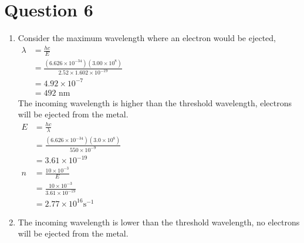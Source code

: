 \documentclass[a4paper, fleqn]{article}
\begin{document}
\section{Question 6}
\begin{enumerate}[label=(\alph{*})]
\item Consider the maximum wavelength where an electron would be ejected,\\
$\begin{aligned}\lambda&=\frac{hc}{E}\\&=\frac{(6.626\times10^{-34})(3.00\times10^8)}{2.52\times1.602\times10^{-19}}\\&=4.92\times10^{-7}\\&=492\text{ nm}\end{aligned}$\\
The incoming wavelength is higher than the threshold wavelength, electrons will be ejected from the metal.\\
$\begin{aligned}E&=\frac{hc}{\lambda}\\&=\frac{(6.626\times10^{-34})(3.0\times10^8)}{550\times10^{-9}}\\&=3.61\times10^{-19}\\n&=\frac{10\times10^{-3}}{E}\\&=\frac{10\times10^{-3}}{3.61\times10^{-19}}\\&=2.77\times10^{16}\text{s}^{-1}\end{aligned}$
\item The incoming wavelength is lower than the threshold wavelength, no electrons will be ejected from the metal.
\end{enumerate}
\end{document}
